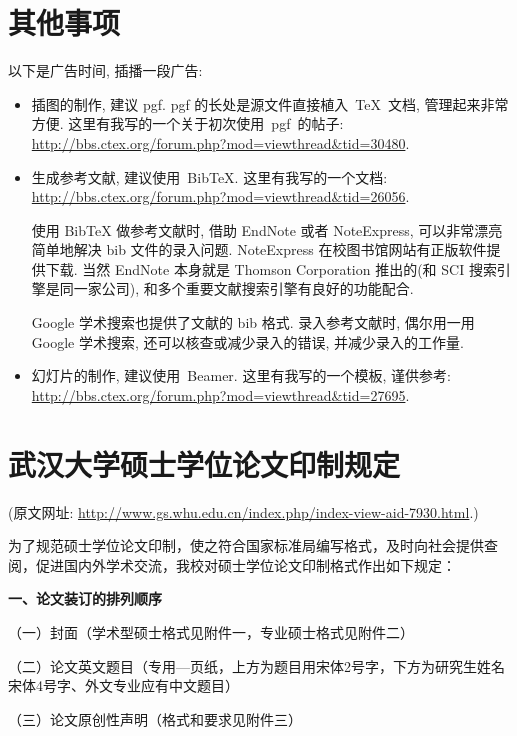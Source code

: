 \documentclass{WHUMaster}   %
\begin{document}
\chapter{其他事项}
以下是广告时间, 插播一段广告:
\begin{itemize}
    \item 插图的制作, 建议 pgf.
          pgf 的长处是源文件直接植入~\TeX~文档, 管理起来非常方便.
    这里有我写的一个关于初次使用~pgf~的帖子:\\    \url{http://bbs.ctex.org/forum.php?mod=viewthread&tid=30480}.
    \item 生成参考文献, 建议使用~BibTeX.  这里有我写的一个文档: \\
    \url{http://bbs.ctex.org/forum.php?mod=viewthread&tid=26056}.

      {\kaishu 使用 BibTeX{} 做参考文献时,
      借助 EndNote 或者 NoteExpress, 可以非常漂亮简单地解决 bib 文件的录入问题.
      NoteExpress 在校图书馆网站有正版软件提供下载.
      当然 EndNote 本身就是 Thomson Corporation 推出的(和 SCI 搜索引擎是同一家公司),
      和多个重要文献搜索引擎有良好的功能配合.

      Google 学术搜索也提供了文献的 bib 格式.
      录入参考文献时, 偶尔用一用 Google 学术搜索, 还可以核查或减少录入的错误, 并减少录入的工作量.}
     \item 幻灯片的制作, 建议使用~Beamer. 这里有我写的一个模板, 谨供参考:\\
    \url{http://bbs.ctex.org/forum.php?mod=viewthread&tid=27695}.
\end{itemize}

\chapter{武汉大学硕士学位论文印制规定}

(原文网址: \url{http://www.gs.whu.edu.cn/index.php/index-view-aid-7930.html}.)

为了规范硕士学位论文印制，使之符合国家标准局编写格式，及时向社会提供查阅，促进国内外学术交流，我校对硕士学位论文印制格式作出如下规定：

\textbf{一、论文装订的排列顺序}

（一）封面（学术型硕士格式见附件一，专业硕士格式见附件二）

（二）论文英文题目（专用—页纸，上方为题目用宋体2号字，下方为研究生姓名宋体4号字、外文专业应有中文题目）

（三）论文原创性声明（格式和要求见附件三）
\end{document}
